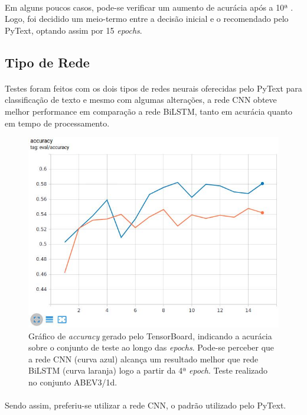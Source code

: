 \documentclass[grad,numbers]{coppe}
\begin{document}
		  	\paragraph{}Em alguns poucos casos, pode-se verificar um aumento de acurácia após a 10ª . Logo, foi decidido um meio-termo entre a decisão inicial e o recomendado pelo PyText, optando assim por 15 \textit{epochs}.
		  \subsection{Tipo de Rede}
			  \paragraph{}Testes foram feitos com os dois tipos de redes neurais oferecidas pelo PyText para classificação de texto e mesmo com algumas alterações, a rede CNN obteve melhor performance em comparação a rede BiLSTM, tanto em acurácia quanto em tempo de processamento.
				\begin{figure}[H]
					\centering
					{\includegraphics[width=13.5cm]{nn-type-graph}
						\caption{Gráfico de \textit{accuracy} gerado pelo TensorBoard, indicando a acurácia sobre o conjunto de teste ao longo das \textit{epochs}. Pode-se perceber que a rede CNN (curva azul) alcança um resultado melhor que rede BiLSTM (curva laranja) logo a partir da 4ª \textit{epoch}. Teste realizado no conjunto ABEV3/1d.}
						\label{fig:nn-type-graph-fig}}
				\end{figure}
			  \paragraph{}Sendo assim, preferiu-se utilizar a rede CNN, o padrão utilizado pelo PyText.
\end{document}
